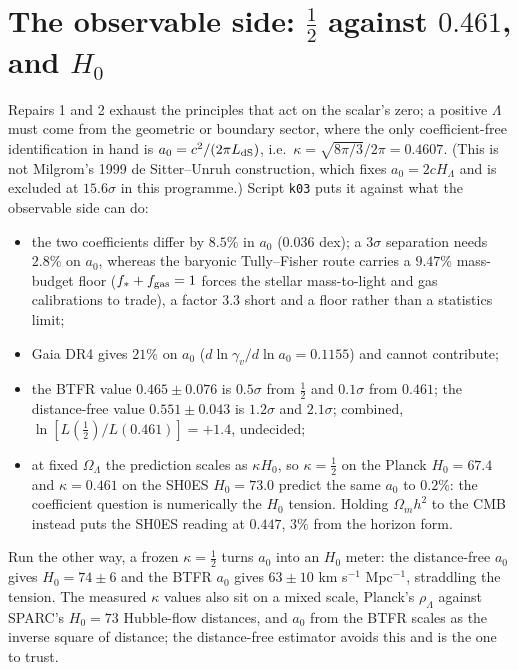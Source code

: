 \documentclass[11pt,letterpaper]{article}
\begin{document}
\section{The observable side: $\tfrac12$ against $0.461$, and $H_0$}
Repairs 1 and 2 exhaust the principles that act on the scalar's zero; a positive $\Lambda$ must come from the geometric or boundary sector, where the only coefficient-free identification in hand is $a_0=c^2/(2\pi L_{\rm dS})$, i.e.\ $\kappa=\sqrt{8\pi/3}/2\pi=0.4607$. (This is not Milgrom's 1999 de Sitter--Unruh construction, which fixes $a_0=2cH_\Lambda$ and is excluded at $15.6\sigma$ in this programme.) Script \texttt{k03} puts it against what the observable side can do:
\begin{itemize}
\item the two coefficients differ by $8.5\%$ in $a_0$ ($0.036$ dex); a $3\sigma$ separation needs $2.8\%$ on $a_0$, whereas the baryonic Tully--Fisher route carries a $9.47\%$ mass-budget floor ($f_*+f_{\rm gas}=1$ forces the stellar mass-to-light and gas calibrations to trade), a factor $3.3$ short and a floor rather than a statistics limit;
\item Gaia DR4 gives $21\%$ on $a_0$ ($d\ln\gamma_v/d\ln a_0=0.1155$) and cannot contribute;
\item the BTFR value $0.465\pm0.076$ is $0.5\sigma$ from $\tfrac12$ and $0.1\sigma$ from $0.461$; the distance-free value $0.551\pm0.043$ is $1.2\sigma$ and $2.1\sigma$; combined, $\ln[L(\tfrac12)/L(0.461)]=+1.4$, undecided;
\item at fixed $\Omega_\Lambda$ the prediction scales as $\kappa H_0$, so $\kappa=\tfrac12$ on the Planck $H_0=67.4$ and $\kappa=0.461$ on the SH0ES $H_0=73.0$ predict the same $a_0$ to $0.2\%$: the coefficient question is numerically the $H_0$ tension. Holding $\Omega_mh^2$ to the CMB instead puts the SH0ES reading at $0.447$, $3\%$ from the horizon form.
\end{itemize}
Run the other way, a frozen $\kappa=\tfrac12$ turns $a_0$ into an $H_0$ meter: the distance-free $a_0$ gives $H_0=74\pm6$ and the BTFR $a_0$ gives $63\pm10$ km s$^{-1}$ Mpc$^{-1}$, straddling the tension. The measured $\kappa$ values also sit on a mixed scale, Planck's $\rho_\Lambda$ against SPARC's $H_0=73$ Hubble-flow distances, and $a_0$ from the BTFR scales as the inverse square of distance; the distance-free estimator avoids this and is the one to trust.
\end{document}
